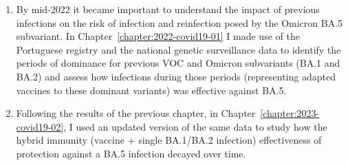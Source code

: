\begin{enumerate}
    \setlength{\itemsep}{1.5pt}
    \setlength{\parskip}{0pt}
    \setlength{\parsep}{0pt}
    \setcounter{enumi}{6}

    \item By mid-2022 it became important to understand the impact of previous infections on the risk of infection and reinfection posed by the Omicron BA.5 subvariant. In Chapter~\ref{chapter:2022-covid19-01} I made use of the Portuguese \covid registry and the national \sars genetic surveillance data to identify the periods of dominance for previous VOC and Omicron subvariants (BA.1 and BA.2) and assess how infections during those periods (representing adapted vaccines to these dominant variants) was effective against BA.5.

    \item Following the results of the previous chapter, in Chapter~\ref{chapter:2023-covid19-02}, I used an updated version of the same data to study how the hybrid immunity (vaccine + single BA.1/BA.2 infection) effectiveness of protection against a BA.5 infection decayed over time.
\end{enumerate}




